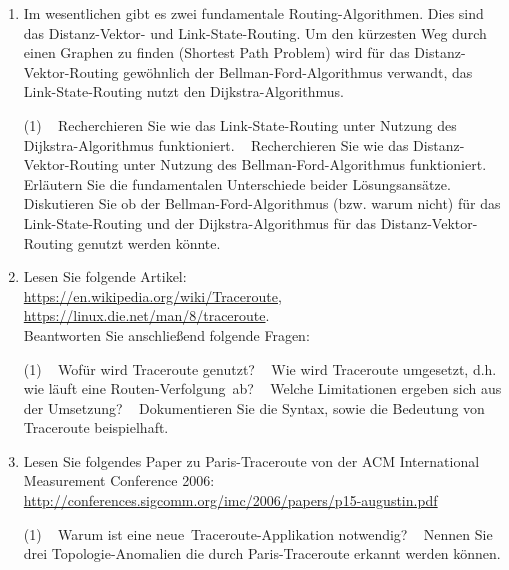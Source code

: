 \documentclass[paper=a4,fontsize=11pt]{scrartcl}%
\numberwithin{equation}{section}
\begin{document}
\begin{enumerate}
	\item Im wesentlichen gibt es zwei fundamentale Routing-Algorithmen. Dies sind das Distanz-Vektor- und Link-State-Routing. Um den kürzesten Weg durch einen Graphen zu finden (Shortest Path Problem) wird für das Distanz-Vektor-Routing gewöhnlich der Bellman-Ford-Algorithmus verwandt, das Link-State-Routing nutzt den Dijkstra-Algorithmus.
	\begin{tasks}(1)
		\task~ Recherchieren Sie wie das Link-State-Routing unter Nutzung des Dijkstra-Algorithmus funktioniert.
		\task~ Recherchieren Sie wie das Distanz-Vektor-Routing unter Nutzung des Bellman-Ford-Algorithmus funktioniert.
		\task~ Erläutern Sie die fundamentalen Unterschiede beider Lösungsansätze.
		\task~ Diskutieren Sie ob der Bellman-Ford-Algorithmus (bzw. warum nicht) für das Link-State-Routing und der Dijkstra-Algorithmus für das Distanz-Vektor-Routing genutzt werden könnte.
	\end{tasks}	
	\item Lesen Sie folgende Artikel:\\
	\url{https://en.wikipedia.org/wiki/Traceroute},\\
	\url{https://linux.die.net/man/8/traceroute}.\\
	Beantworten Sie anschließend folgende Fragen:
	\begin{tasks}(1)
		\task~ Wofür wird Traceroute genutzt?
		\task~ Wie wird Traceroute umgesetzt, d.h. wie läuft eine \glqq Routen-Verfolgung\grqq\ ab?
		\task~ Welche Limitationen ergeben sich aus der Umsetzung?
		\task~ Dokumentieren Sie die Syntax, sowie die Bedeutung von Traceroute beispielhaft.
	\end{tasks}
	\item Lesen Sie folgendes Paper zu Paris-Traceroute von der ACM International Measurement Conference 2006:\\
	\url{http://conferences.sigcomm.org/imc/2006/papers/p15-augustin.pdf}
	\begin{tasks}(1)
		\task~ Warum ist eine \glqq neue\grqq\ Traceroute-Applikation notwendig?
		\task~ Nennen Sie drei Topologie-Anomalien die durch Paris-Traceroute erkannt werden können.
	\end{tasks}
\end{enumerate}
\end{document}
